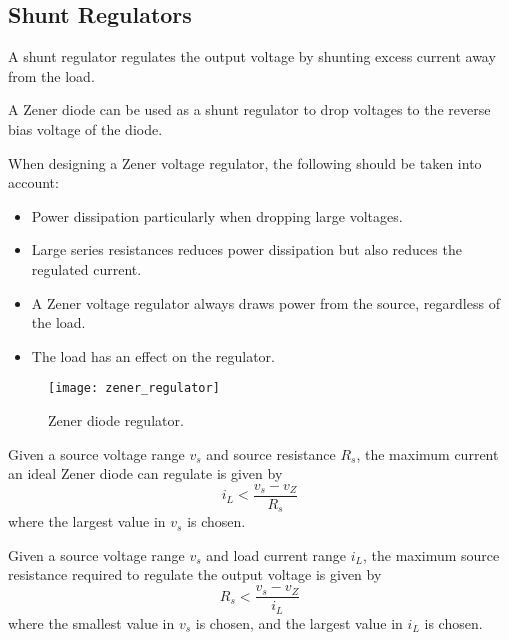 \documentclass{article}
\begin{document}
\subsection{Shunt Regulators}
\begin{definition}
    A shunt regulator regulates the output voltage by shunting excess current away from the load.
\end{definition}
A Zener diode can be used as a shunt regulator to drop voltages to the reverse bias voltage of the diode.
\begin{remark}
    When designing a Zener voltage regulator, the following should be taken into account:
    \begin{itemize}
        \item Power dissipation particularly when dropping large voltages.
        \item Large series resistances reduces power dissipation but also reduces the regulated current.
        \item A Zener voltage regulator always draws power from the source, regardless of the load.
        \item The load has an effect on the regulator.
    \end{itemize}
\end{remark}
\begin{figure}[H]
    \centering
    \texttt{[image: zener\_regulator]}
    \caption{Zener diode regulator.}
\end{figure}
\begin{theorem}
    Given a source voltage range $v_s$ and source resistance $R_s$, the maximum current an ideal
    Zener diode can regulate is given by
    \begin{equation*}
        i_L < \frac{v_s - v_Z}{R_s}
    \end{equation*}
    where the largest value in $v_s$ is chosen.
\end{theorem}
\begin{theorem}
    Given a source voltage range $v_s$ and load current range $i_L$, the maximum source resistance required
    to regulate the output voltage is given by
    \begin{equation*}
        R_s < \frac{v_s - v_Z}{i_L}
    \end{equation*}
    where the smallest value in $v_s$ is chosen, and the largest value in $i_L$ is chosen.
\end{theorem}
\end{document}
